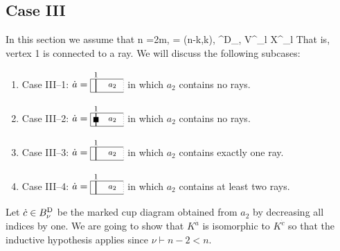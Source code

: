 \documentclass[11pt,reqno]{amsart}
\numberwithin{equation}{section}
\theoremstyle{definition}
\newcommand{\BD}{{B}^\textup{D}}
\newcommand{\da}{\dot{a}}
\newcommand{\dc}{\dot{c}}
\newcommand{\ld}{\lambda}
\newcommand{\icupa}{
\begin{tikzpicture}[baseline={(0,-.3)}, scale = 0.8]
\draw (2.25,0) -- (0.75,0) -- (0.75,-.6) -- (2.25,-.6);
\draw[dotted] (2.25,-.6) -- (2.25,0);\begin{footnotesize}
\node at (1,.2) {$1$};
\node at (1.75, -.3) {$a_2$};
\end{footnotesize}
\draw[thick] (1,0) -- (1, -.6);
\end{tikzpicture}
}
\newcommand{\icupb}{
\begin{tikzpicture}[baseline={(0,-.3)}, scale = 0.8]
\draw (2.25,0) -- (0.75,0) -- (0.75,-.6) -- (2.25,-.6);
\draw[dotted] (2.25,-.6) -- (2.25,0);\begin{footnotesize}
\node at (1, -.3) {$\blacksquare$};
\node at (1,.2) {$1$};
\node at (1.75, -.3) {$a_2$};
\end{footnotesize}
\draw[thick] (1,0) -- (1, -.6);
\end{tikzpicture}
}
\begin{document}
\subsection{Case III}
In this section we assume that
\eq\label{eq:caseIII}
n =2m,
\quad
\ld = (n-k,k),
\quad
\da\in \BD_{\ld},
 \not\in V^{\da}_l \sqcup X^{\da}_l
\endeq
That is, vertex 1 is connected to a ray.
We will discuss the following subcases:
\begin{enumerate}[~]
\item Case III--1: $\da = \icupa$ in which $a_2$ contains no rays.
\item Case III--2: $\da = \icupb$ in which $a_2$ contains no rays.
\item Case III--3: $\da = \icupa$ in which $a_2$ contains exactly one ray.
\item Case III--4: $\da = \icupa$ in which $a_2$ contains at least two rays.
\end{enumerate}
Let $\dc \in \BD_{\nu}$ be the marked cup diagram obtained from $a_2$ by decreasing all indices by one. 
We are going to show that $K^{\da}$ is isomorphic to $K^{\dc}$ so that the inductive hypothesis applies since $\nu \vdash n-2 < n$.
\end{document}
